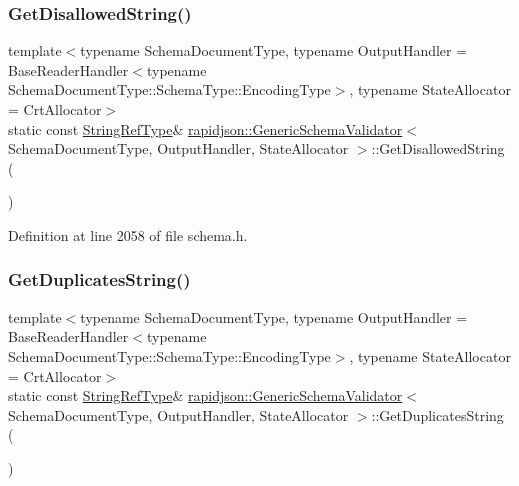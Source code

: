 \subsubsection{\texorpdfstring{GetDisallowedString()}{GetDisallowedString()}}
{\footnotesize\ttfamily template$<$typename Schema\+Document\+Type, typename Output\+Handler = Base\+Reader\+Handler$<$typename Schema\+Document\+Type\+::\+Schema\+Type\+::\+Encoding\+Type$>$, typename State\+Allocator = Crt\+Allocator$>$ \\
static const \mbox{\hyperlink{classrapidjson_1_1_generic_schema_validator_af6d33bab73e771af8c06f2b05e878350}{String\+Ref\+Type}}\& \mbox{\hyperlink{classrapidjson_1_1_generic_schema_validator}{rapidjson\+::\+Generic\+Schema\+Validator}}$<$ Schema\+Document\+Type, Output\+Handler, State\+Allocator $>$\+::Get\+Disallowed\+String (\begin{DoxyParamCaption}{ }\end{DoxyParamCaption})\hspace{0.3cm}{\ttfamily [static]}}



Definition at line 2058 of file schema.\+h.

\mbox{\label{classrapidjson_1_1_generic_schema_validator_a0470daea32c811ff79d0354e5e85f4db}} 
\subsubsection{\texorpdfstring{GetDuplicatesString()}{GetDuplicatesString()}}
{\footnotesize\ttfamily template$<$typename Schema\+Document\+Type, typename Output\+Handler = Base\+Reader\+Handler$<$typename Schema\+Document\+Type\+::\+Schema\+Type\+::\+Encoding\+Type$>$, typename State\+Allocator = Crt\+Allocator$>$ \\
static const \mbox{\hyperlink{classrapidjson_1_1_generic_schema_validator_af6d33bab73e771af8c06f2b05e878350}{String\+Ref\+Type}}\& \mbox{\hyperlink{classrapidjson_1_1_generic_schema_validator}{rapidjson\+::\+Generic\+Schema\+Validator}}$<$ Schema\+Document\+Type, Output\+Handler, State\+Allocator $>$\+::Get\+Duplicates\+String (\begin{DoxyParamCaption}{ }\end{DoxyParamCaption})\hspace{0.3cm}{\ttfamily [static]}}



